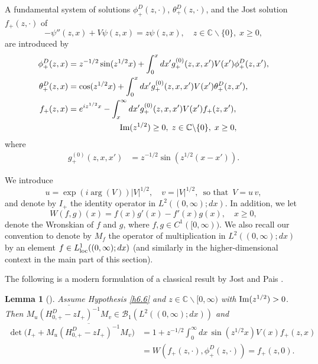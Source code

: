 \documentclass[reqno,10pt, centertags]{amsart}
\newcommand{\bbC}{{\mathbb{C}}}
\newcommand{\cB}{{\mathcal B}}
\newcommand{\abs}[1]{\left\lvert#1\right\rvert}
\newcommand{\no}{\nonumber}
\newcommand{\lb}{\label}
\newcommand{\ol}{\overline}
\newcommand{\loc}{\text{\rm{loc}}}
\renewcommand{\Im}{\text{\rm Im}}
\numberwithin{equation}{section}
\newtheorem{lemma}[theorem]{Lemma}
\theoremstyle{definition}
\begin{document}
A fundamental system of solutions $\phi_+^D(z,\cdot)$,
$\theta_+^D(z,\cdot)$, and the Jost solution $f_+(z,\cdot)$ of
\begin{equation}
-\psi''(z,x)+V\psi(z,x)=z\psi(z,x), \quad z\in\bbC\backslash\{0\}, \;
x\geq 0,   \lb{6.5a}
\end{equation}
are introduced by
\begin{align}
\phi_+^D(z,x)&=z^{-1/2}\sin(z^{1/2}x)+\int_0^x dx' g^{(0)}_+(z,x,x')
V(x')\phi_+^D(z,x'), \\
\theta_+^D(z,x)&=\cos(z^{1/2}x)+\int_0^x dx' g^{(0)}_+(z,x,x')
V(x')\theta_+^D (z,x'), \\
f_+(z,x)&=e^{iz^{1/2}x}-\int_x^\infty dx'
g^{(0)}_+(z,x,x')V(x')f_+(z,x'),  \lb{6.8a} \\
&\hspace*{22mm} \Im(z^{1/2})\geq 0, \; z\in\bbC\backslash\{0\}, \;
x\geq 0,  \no
\end{align}
where
\begin{align}
g^{(0)}_+(z,x,x')&=z^{-1/2}\sin(z^{1/2}(x-x')).
\end{align}

We introduce
\begin{equation}
u=\exp(i\arg(V))\abs{V}^{1/2}, \quad v=\abs{V}^{1/2}, \, \text{ so
that } \, V=u\, v,
\end{equation}
and denote by $I_+$ the identity operator in $L^2((0,\infty); dx)$. In
addition, we let
\begin{equation}
W(f,g)(x)=f(x)g'(x)-f'(x)g(x), \quad x \geq 0,
\end{equation}
denote the Wronskian of $f$ and $g$, where $f,g \in C^1([0,\infty))$. We
also recall our convention to denote by $M_f$ the operator of
multiplication in $L^2((0,\infty);dx)$ by an element $f\in
L^1_{\loc}((0,\infty);dx)$ (and similarly in the higher-dimensional
context in the main part of this section).

The following is a modern formulation of a classical result by Jost and
Pais \cite{JP51}.

\begin{lemma}[{\cite[Theorem\ 4.3]{GM03}}] \lb{l6.7}
Assume Hypothesis \ref{h6.6} and $z\in\bbC\backslash [0,\infty)$
with $\Im(z^{1/2})>0$. Then $\ol{M_u(H_{0,+}^D-z I_+)^{-1}M_v} \in
\cB_1(L^2((0,\infty);dx))$ and
\begin{align}
\det\big(I_+ +\ol{M_u(H_{0, +}^D-z I_+)^{-1}M_v}\big) &=
1+z^{-1/2}\int_0^\infty dx\, \sin(z^{1/2}x)V(x)f_+(z,x)   \no \\
&= W(f_+(z,\cdot),\phi_+^D(z,\cdot)) = f_+(z,0). \lb{6.75}
\end{align}
\end{lemma}
\end{document}
